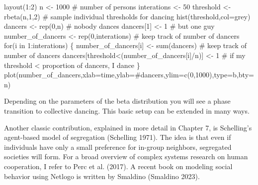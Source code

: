 \documentclass[
  letterpaper,
]{scrbook}
\newenvironment{Shaded}{\begin{snugshade}}{\end{snugshade}}
\newcommand{\AttributeTok}[1]{\textcolor[rgb]{0.40,0.45,0.13}{#1}}
\newcommand{\CommentTok}[1]{\textcolor[rgb]{0.37,0.37,0.37}{#1}}
\newcommand{\ControlFlowTok}[1]{\textcolor[rgb]{0.00,0.23,0.31}{#1}}
\newcommand{\DecValTok}[1]{\textcolor[rgb]{0.68,0.00,0.00}{#1}}
\newcommand{\FunctionTok}[1]{\textcolor[rgb]{0.28,0.35,0.67}{#1}}
\newcommand{\NormalTok}[1]{\textcolor[rgb]{0.00,0.23,0.31}{#1}}
\newcommand{\OtherTok}[1]{\textcolor[rgb]{0.00,0.23,0.31}{#1}}
\newcommand{\SpecialCharTok}[1]{\textcolor[rgb]{0.37,0.37,0.37}{#1}}
\newcommand{\StringTok}[1]{\textcolor[rgb]{0.13,0.47,0.30}{#1}}
\begin{document}
\begin{Shaded}
\begin{Highlighting}[]
\FunctionTok{layout}\NormalTok{(}\DecValTok{1}\SpecialCharTok{:}\DecValTok{2}\NormalTok{)}
\NormalTok{n }\OtherTok{\textless{}{-}} \DecValTok{1000} \CommentTok{\# number of persons}
\NormalTok{interations }\OtherTok{\textless{}{-}} \DecValTok{50}
\NormalTok{threshold }\OtherTok{\textless{}{-}} \FunctionTok{rbeta}\NormalTok{(n,}\DecValTok{1}\NormalTok{,}\DecValTok{2}\NormalTok{) }\CommentTok{\# sample individual thresholds for dancing}
\FunctionTok{hist}\NormalTok{(threshold,}\AttributeTok{col=}\StringTok{\textquotesingle{}grey\textquotesingle{}}\NormalTok{)}
\NormalTok{dancers }\OtherTok{\textless{}{-}} \FunctionTok{rep}\NormalTok{(}\DecValTok{0}\NormalTok{,n) }\CommentTok{\# nobody dances}
\NormalTok{dancers[}\DecValTok{1}\NormalTok{] }\OtherTok{\textless{}{-}} \DecValTok{1} \CommentTok{\# but one guy}
\NormalTok{number\_of\_dancers }\OtherTok{\textless{}{-}} \FunctionTok{rep}\NormalTok{(}\DecValTok{0}\NormalTok{,interations) }\CommentTok{\# keep track of number of dancers}
\ControlFlowTok{for}\NormalTok{(i }\ControlFlowTok{in} \DecValTok{1}\SpecialCharTok{:}\NormalTok{interations)}
\NormalTok{\{}
\NormalTok{  number\_of\_dancers[i] }\OtherTok{\textless{}{-}} \FunctionTok{sum}\NormalTok{(dancers) }\CommentTok{\# keep track of number of dancers}
\NormalTok{  dancers[threshold}\SpecialCharTok{\textless{}}\NormalTok{(number\_of\_dancers[i]}\SpecialCharTok{/}\NormalTok{n)] }\OtherTok{\textless{}{-}} \DecValTok{1} 
\CommentTok{\# if my threshold \textless{} proportion of dancers, I dance}
\NormalTok{\}}
\FunctionTok{plot}\NormalTok{(number\_of\_dancers,}\AttributeTok{xlab=}\StringTok{\textquotesingle{}time\textquotesingle{}}\NormalTok{,}\AttributeTok{ylab=}\StringTok{\textquotesingle{}\#dancers\textquotesingle{}}\NormalTok{,}\AttributeTok{ylim=}\FunctionTok{c}\NormalTok{(}\DecValTok{0}\NormalTok{,}\DecValTok{1000}\NormalTok{),}\AttributeTok{type=}\StringTok{\textquotesingle{}b\textquotesingle{}}\NormalTok{,}\AttributeTok{bty=}\StringTok{\textquotesingle{}n\textquotesingle{}}\NormalTok{)}
\end{Highlighting}
\end{Shaded}

Depending on the parameters of the beta distribution you will see a
phase transition to collective dancing. This basic setup can be extended
in many ways.

Another classic contribution, explained in more detail in Chapter 7, is
Schelling's agent-based model of segregation (Schelling 1971). The idea
is that even if individuals have only a small preference for in-group
neighbors, segregated societies will form. For a broad overview of
complex systems research on human cooperation, I refer to Perc et al.
(2017). A recent book on modeling social behavior using Netlogo is
written by Smaldino (Smaldino 2023).
\end{document}
